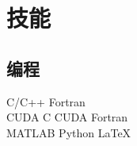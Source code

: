\documentclass[]{deedy-resume-openfont}
\begin{document}
\begin{minipage}[t]{0.25\textwidth}


\section{技能}
\sectionsep
\subsection{编程}
C/C++ \textbullet{} Fortran \\
CUDA C \textbullet{} CUDA Fortran \\
MATLAB \textbullet{} Python \textbullet{} \LaTeX \\
\sectionsep



%
%

\end{minipage} 
\end{document}
